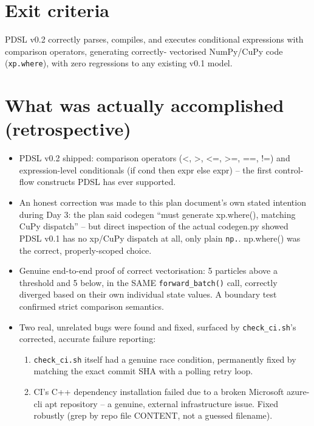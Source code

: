 \documentclass[11pt]{article}
\begin{document}
\section*{Exit criteria}
PDSL v0.2 correctly parses, compiles, and executes conditional
expressions with comparison operators, generating correctly-
vectorised NumPy/CuPy code (\texttt{xp.where}), with zero regressions
to any existing v0.1 model.


\section*{What was actually accomplished (retrospective)}

\begin{itemize}[leftmargin=*]
  \item PDSL v0.2 shipped: comparison operators (<, >, <=, >=, ==,
    !=) and expression-level conditionals (if cond then expr else
    expr) -- the first control-flow constructs PDSL has ever
    supported.
  \item An honest correction was made to this plan document's own
    stated intention during Day 3: the plan said codegen ``must
    generate xp.where(), matching CuPy dispatch'' -- but direct
    inspection of the actual codegen.py showed PDSL v0.1 has no
    xp/CuPy dispatch at all, only plain \texttt{np.}. np.where() was
    the correct, properly-scoped choice.
  \item Genuine end-to-end proof of correct vectorisation: 5
    particles above a threshold and 5 below, in the SAME
    \texttt{forward\_batch()} call, correctly diverged based on their
    own individual state values. A boundary test confirmed strict
    comparison semantics.
  \item Two real, unrelated bugs were found and fixed, surfaced by
    \texttt{check\_ci.sh}'s corrected, accurate failure reporting:
  \begin{enumerate}[leftmargin=*]
    \item \texttt{check\_ci.sh} itself had a genuine race condition,
      permanently fixed by matching the exact commit SHA with a
      polling retry loop.
    \item CI's C++ dependency installation failed due to a broken
      Microsoft azure-cli apt repository -- a genuine, external
      infrastructure issue. Fixed robustly (grep by repo file
      CONTENT, not a guessed filename).
  \end{enumerate}
\end{itemize}
\end{document}
